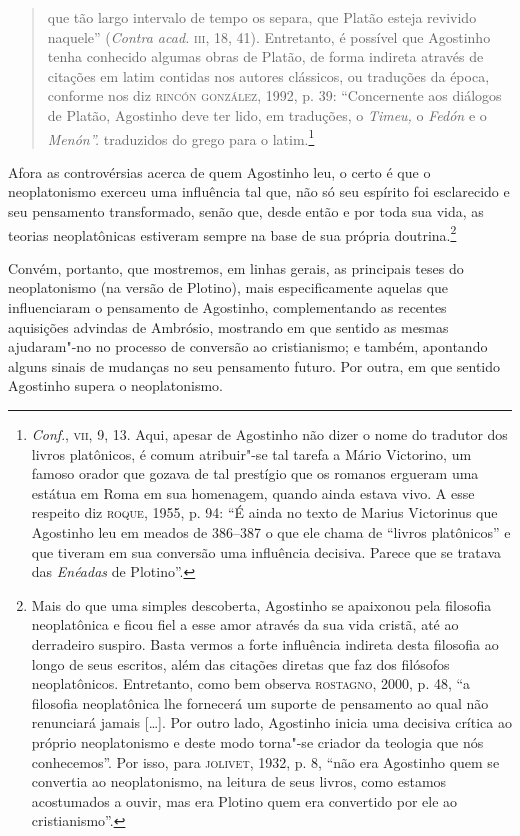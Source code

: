 \begin{quote}
{que tão largo intervalo de tempo os separa, que Platão esteja
revivido naquele” (\emph{Contra acad.} \textsc{iii}, 18, 41).
Entretanto, é possível que Agostinho tenha conhecido  algumas
obras de Platão, de forma indireta através de citações em latim
contidas nos autores clássicos, ou traduções da época, conforme
nos diz \textsc{rincón} \textsc{gonzález}, 1992, p. 39: “Concernente aos diálogos
de Platão, Agostinho deve ter lido, em traduções, o
\emph{Timeu,} o \emph{Fedón} e o \emph{Menón”.}}
traduzidos do grego para o latim.\footnote{ \emph{Conf}.,
\textsc{vii},
9, 13. Aqui, apesar de Agostinho não dizer o nome do tradutor
dos livros platônicos, é comum atribuir"-se tal tarefa a Mário
Victorino, um famoso orador que gozava de tal prestígio que os
romanos ergueram uma estátua em Roma em sua homenagem, quando
ainda estava vivo. A esse respeito diz \textsc{roque}, 1955, p. 94: “É
ainda no texto de Marius Victorinus que Agostinho leu em meados
de 386--387 o que ele chama de ``livros platônicos'' e que tiveram
em sua conversão uma influência decisiva. Parece que se tratava
das \emph{Enéadas} de Plotino”.} 
\end{quote}

Afora as controvérsias acerca de quem Agostinho leu,  o certo é
que o  neoplatonismo exerceu uma influência tal que, não só seu
espírito foi esclarecido e seu pensamento transformado, senão
que, desde então e por toda sua vida, as  teorias neoplatônicas
estiveram sempre na base de sua  própria doutrina.\footnote{ Mais
do que uma simples descoberta, Agostinho se apaixonou pela
filosofia neoplatônica e ficou fiel a esse amor através da sua
vida cristã, até ao derradeiro suspiro. Basta vermos a forte
influência indireta desta filosofia ao longo de seus escritos,
além das citações diretas que faz dos filósofos neoplatônicos.
Entretanto, como bem observa \textsc{rostagno}, 2000, p. 48,  “a
filosofia neoplatônica lhe fornecerá um suporte de pensamento ao
qual não renunciará jamais [\ldots{}]. Por outro lado, Agostinho
inicia uma decisiva crítica ao próprio neoplatonismo e deste
modo torna"-se criador da teologia que nós conhecemos”. Por isso,
para \textsc{jolivet}, 1932, p. 8, “não era Agostinho quem se convertia
ao neoplatonismo, na leitura de seus livros, como estamos
acostumados a ouvir, mas era Plotino quem era convertido por ele
ao cristianismo”.} 

Convém, portanto, que mostremos, em linhas gerais, as principais
teses do neoplatonismo (na versão de Plotino), mais
especificamente aquelas que influenciaram o pensamento de
Agostinho, complementando as recentes aquisições advindas de
Ambrósio, mostrando em que sentido as mesmas ajudaram"-no no
processo de conversão ao cristianismo; e também, apontando
alguns sinais de mudanças no seu pensamento futuro. Por outra,
em que sentido Agostinho supera o neoplatonismo.



